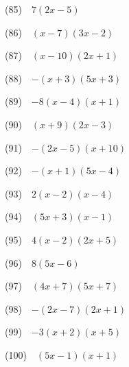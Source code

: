 \documentclass[a4j,twocolumn,10pt,fleqn]{jarticle}
\begin{document}
(85)~~$7(2x-5)$

(86)~~$(x-7)(3x-2)$

(87)~~$(x-10)(2x+1)$

(88)~~$-(x+3)(5x+3)$

(89)~~$-8(x-4)(x+1)$

(90)~~$(x+9)(2x-3)$

(91)~~$-(2x-5)(x+10)$

(92)~~$-(x+1)(5x-4)$

(93)~~$2(x-2)(x-4)$

(94)~~$(5x+3)(x-1)$

(95)~~$4(x-2)(2x+5)$

(96)~~$8(5x-6)$

(97)~~$(4x+7)(5x+7)$

(98)~~$-(2x-7)(2x+1)$

(99)~~$-3(x+2)(x+5)$

(100)~~$(5x-1)(x+1)$
\end{document}
